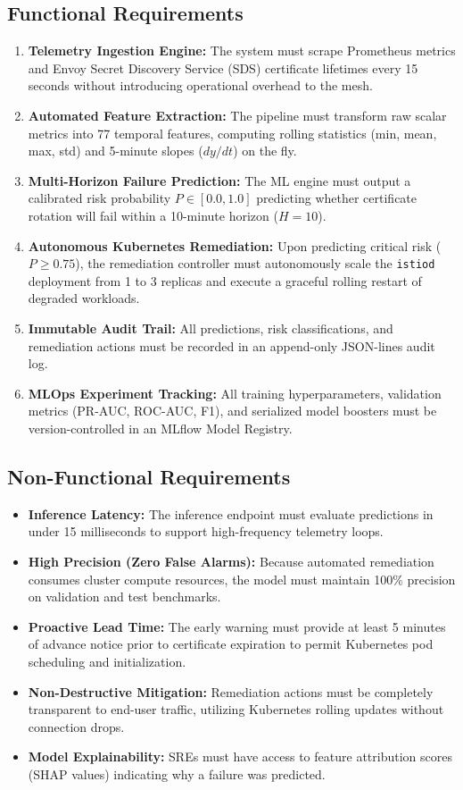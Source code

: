 \documentclass[12pt,a4paper]{report}
\begin{document}
\subsection{Functional Requirements}
\begin{enumerate}
    \item \textbf{Telemetry Ingestion Engine:} The system must scrape Prometheus metrics and Envoy Secret Discovery Service (SDS) certificate lifetimes every 15 seconds without introducing operational overhead to the mesh.
    \item \textbf{Automated Feature Extraction:} The pipeline must transform raw scalar metrics into 77 temporal features, computing rolling statistics (min, mean, max, std) and 5-minute slopes ($dy/dt$) on the fly.
    \item \textbf{Multi-Horizon Failure Prediction:} The ML engine must output a calibrated risk probability $P \in [0.0, 1.0]$ predicting whether certificate rotation will fail within a 10-minute horizon ($H=10$).
    \item \textbf{Autonomous Kubernetes Remediation:} Upon predicting critical risk ($P \ge 0.75$), the remediation controller must autonomously scale the \texttt{istiod} deployment from 1 to 3 replicas and execute a graceful rolling restart of degraded workloads.
    \item \textbf{Immutable Audit Trail:} All predictions, risk classifications, and remediation actions must be recorded in an append-only JSON-lines audit log.
    \item \textbf{MLOps Experiment Tracking:} All training hyperparameters, validation metrics (PR-AUC, ROC-AUC, F1), and serialized model boosters must be version-controlled in an MLflow Model Registry.
\end{enumerate}

\subsection{Non-Functional Requirements}
\begin{itemize}
    \item \textbf{Inference Latency:} The inference endpoint must evaluate predictions in under 15 milliseconds to support high-frequency telemetry loops.
    \item \textbf{High Precision (Zero False Alarms):} Because automated remediation consumes cluster compute resources, the model must maintain 100\% precision on validation and test benchmarks.
    \item \textbf{Proactive Lead Time:} The early warning must provide at least 5 minutes of advance notice prior to certificate expiration to permit Kubernetes pod scheduling and initialization.
    \item \textbf{Non-Destructive Mitigation:} Remediation actions must be completely transparent to end-user traffic, utilizing Kubernetes rolling updates without connection drops.
    \item \textbf{Model Explainability:} SREs must have access to feature attribution scores (SHAP values) indicating why a failure was predicted.
\end{itemize}
\end{document}
